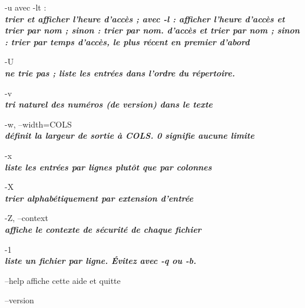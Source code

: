 \documentclass{article}
\begin{document}
         \par-u avec -lt :\\    \textit{\textbf{trier et afficher l'heure d'accès ; avec -l : afficher l'heure d'accès et trier par nom ; sinon : trier par nom.
              d'accès et trier par nom ; sinon : trier par temps d'accès, le plus récent en premier
              d'abord}}\\

      \par -U \\
		 \textit{\textbf{ne trie pas ; liste les entrées dans l'ordre du répertoire.}}\\

       \par-v\\
		 \textit{\textbf{ tri naturel des numéros (de version) dans le texte}}\\

       \par-w, --width=COLS\\
              \textit{\textbf{définit la largeur de sortie à COLS.  0 signifie aucune limite}}\\

      \par -x\\
		\textit{\textbf{ liste les entrées par lignes plutôt que par colonnes}}\\

      \par -X\\
	 \textit{\textbf{trier alphabétiquement par extension d'entrée}}\\

       \par-Z, --context\\
              \textit{\textbf{ affiche le contexte de sécurité de chaque fichier}}\\

        \par-1 \\
		\textit{\textbf{liste un fichier par ligne.  Évitez  avec -q ou -b.}}\\

       \par--help affiche cette aide et quitte\\

        \par--version\\
\end{document}
